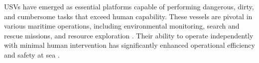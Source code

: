 \documentclass{erauthesis}
\begin{document}








\Acp{USV} have emerged as essential platforms capable of performing dangerous, dirty, and cumbersome tasks that exceed human capability. These vessels are pivotal in various maritime operations, including environmental monitoring, search and rescue missions, and resource exploration \cite{liebergall, eckstein2024}.%
Their ability to operate independently with minimal human intervention has significantly enhanced operational efficiency and safety at sea \cite{bai2022}.%
\end{document}
